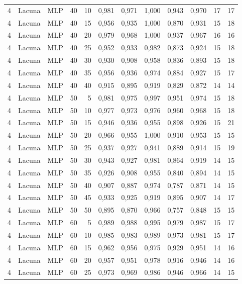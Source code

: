 \begin{longtable}{ccclrrrrrrrr}
4 & Lacuna & MLP & 40 & 10 & 0,981 & 0,971 & 1,000 & 0,943 & 0,970 & 17 & 17 \\
4 & Lacuna & MLP & 40 & 15 & 0,956 & 0,935 & 1,000 & 0,870 & 0,931 & 15 & 18 \\
4 & Lacuna & MLP & 40 & 20 & 0,979 & 0,968 & 1,000 & 0,937 & 0,967 & 16 & 16 \\
4 & Lacuna & MLP & 40 & 25 & 0,952 & 0,933 & 0,982 & 0,873 & 0,924 & 15 & 18 \\
4 & Lacuna & MLP & 40 & 30 & 0,930 & 0,908 & 0,958 & 0,836 & 0,893 & 15 & 18 \\
4 & Lacuna & MLP & 40 & 35 & 0,956 & 0,936 & 0,974 & 0,884 & 0,927 & 15 & 17 \\
4 & Lacuna & MLP & 40 & 40 & 0,915 & 0,895 & 0,919 & 0,829 & 0,872 & 14 & 14 \\
4 & Lacuna & MLP & 50 & 5 & 0,981 & 0,975 & 0,997 & 0,951 & 0,974 & 15 & 18 \\
4 & Lacuna & MLP & 50 & 10 & 0,977 & 0,973 & 0,976 & 0,960 & 0,968 & 15 & 18 \\
4 & Lacuna & MLP & 50 & 15 & 0,946 & 0,936 & 0,955 & 0,898 & 0,926 & 15 & 21 \\
4 & Lacuna & MLP & 50 & 20 & 0,966 & 0,955 & 1,000 & 0,910 & 0,953 & 15 & 15 \\
4 & Lacuna & MLP & 50 & 25 & 0,937 & 0,927 & 0,941 & 0,889 & 0,914 & 15 & 19 \\
4 & Lacuna & MLP & 50 & 30 & 0,943 & 0,927 & 0,981 & 0,864 & 0,919 & 14 & 15 \\
4 & Lacuna & MLP & 50 & 35 & 0,926 & 0,908 & 0,955 & 0,840 & 0,894 & 14 & 15 \\
4 & Lacuna & MLP & 50 & 40 & 0,907 & 0,887 & 0,974 & 0,787 & 0,871 & 14 & 15 \\
4 & Lacuna & MLP & 50 & 45 & 0,933 & 0,925 & 0,919 & 0,895 & 0,907 & 14 & 17 \\
4 & Lacuna & MLP & 50 & 50 & 0,895 & 0,870 & 0,966 & 0,757 & 0,848 & 15 & 15 \\
4 & Lacuna & MLP & 60 & 5 & 0,989 & 0,988 & 0,995 & 0,979 & 0,987 & 15 & 17 \\
4 & Lacuna & MLP & 60 & 10 & 0,985 & 0,983 & 0,989 & 0,973 & 0,981 & 15 & 17 \\
4 & Lacuna & MLP & 60 & 15 & 0,962 & 0,956 & 0,975 & 0,929 & 0,951 & 14 & 16 \\
4 & Lacuna & MLP & 60 & 20 & 0,957 & 0,951 & 0,978 & 0,916 & 0,946 & 14 & 16 \\
4 & Lacuna & MLP & 60 & 25 & 0,973 & 0,969 & 0,986 & 0,946 & 0,966 & 14 & 15 \\

\end{longtable}
